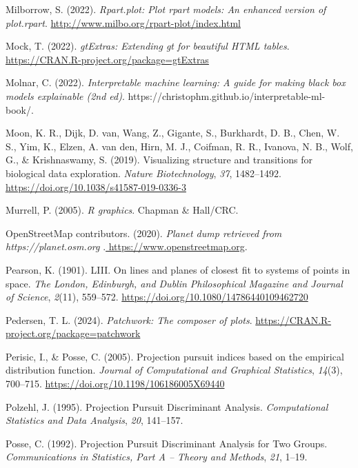\documentclass[
  letterpaper,
]{krantz}
\newlength{\cslhangindent}
\newenvironment{CSLReferences}[2] %
 {\begin{list}{}{%
  \setlength{\itemindent}{0pt}
  \setlength{\leftmargin}{0pt}
  \setlength{\parsep}{0pt}
  \ifodd #1
   \setlength{\leftmargin}{\cslhangindent}
   \setlength{\itemindent}{-1\cslhangindent}
  \fi
  \setlength{\itemsep}{#2\baselineskip}}}
 {\end{list}}
\begin{document}
\begin{CSLReferences}{1}{0}
Milborrow, S. (2022). \emph{Rpart.plot: Plot rpart models: An enhanced
version of plot.rpart}. \url{http://www.milbo.org/rpart-plot/index.html}

Mock, T. (2022). \emph{gtExtras: Extending gt for beautiful HTML
tables}. \url{https://CRAN.R-project.org/package=gtExtras}

Molnar, C. (2022). \emph{Interpretable machine learning: A guide for
making black box models explainable (2nd ed)}.
https://christophm.github.io/interpretable-ml-book/.

Moon, K. R., Dijk, D. van, Wang, Z., Gigante, S., Burkhardt, D. B.,
Chen, W. S., Yim, K., Elzen, A. van den, Hirn, M. J., Coifman, R. R.,
Ivanova, N. B., Wolf, G., \& Krishnaswamy, S. (2019). Visualizing
structure and transitions for biological data exploration. \emph{Nature
Biotechnology}, \emph{37}, 1482--1492.
\url{https://doi.org/10.1038/s41587-019-0336-3}

Murrell, P. (2005). \emph{R graphics}. Chapman \& Hall/CRC.

OpenStreetMap contributors. (2020). \emph{{Planet dump retrieved from
https://planet.osm.org
}}.\href{\%20https://www.openstreetmap.org\%20}{ https://www.openstreetmap.org}.

Pearson, K. (1901). LIII. On lines and planes of closest fit to systems
of points in space. \emph{The London, Edinburgh, and Dublin
Philosophical Magazine and Journal of Science}, \emph{2}(11), 559--572.
\url{https://doi.org/10.1080/14786440109462720}

Pedersen, T. L. (2024). \emph{Patchwork: The composer of plots}.
\url{https://CRAN.R-project.org/package=patchwork}

Perisic, I., \& Posse, C. (2005). Projection pursuit indices based on
the empirical distribution function. \emph{Journal of Computational and
Graphical Statistics}, \emph{14}(3), 700--715.
\url{https://doi.org/10.1198/106186005X69440}

Polzehl, J. (1995). Projection {P}ursuit {D}iscriminant {A}nalysis.
\emph{Computational Statistics and Data Analysis}, \emph{20}, 141--157.

Posse, C. (1992). Projection {P}ursuit {D}iscriminant {A}nalysis for
{T}wo {G}roups. \emph{Communications in Statistics, Part A -- Theory and
Methods}, \emph{21}, 1--19.


\end{CSLReferences}
\end{document}
